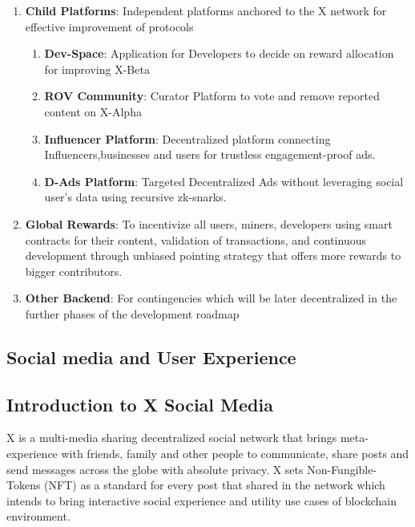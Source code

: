 \documentclass[letterpaper,11pt]{article}
\begin{document}
\begin{enumerate}[wide, labelwidth=!, labelindent=0pt]
\begin{enumerate}[wide, labelwidth=!, labelindent=0pt]
\end{enumerate}

\item \textbf{Child Platforms}: Independent platforms anchored to the X network for effective improvement of protocols

\begin{enumerate}[wide, labelwidth=!, labelindent=0pt]

\item \textbf{Dev-Space}: Application for Developers to decide on reward allocation for improving X-Beta

\item \textbf{ROV Community}: Curator Platform to vote and remove reported content on X-Alpha
\item \textbf{Influencer Platform}: Decentralized platform connecting Influencers,businesses and users for trustless engagement-proof ads.

\item \textbf{D-Ads Platform}: Targeted Decentralized Ads without leveraging social user's data using recursive zk-snarks.

\end{enumerate}

\item \textbf{Global Rewards}: To incentivize all users, miners, developers using smart contracts for their content, validation of transactions, and continuous development through unbiased pointing strategy that offers more rewards to bigger contributors.


\item \textbf{Other Backend}: For contingencies which will be later decentralized in the further phases of the development roadmap

\end{enumerate}

\subsection{\textbf{Social media and User Experience}}




\subsection{\textbf{Introduction to X Social Media}}

X is a multi-media sharing decentralized social network that brings meta-experience with friends, family and other people to communicate, share posts and send messages across the globe with absolute privacy. X sets Non-Fungible-Tokens (NFT) as a standard for every post that shared in the network which intends to bring interactive social experience and utility use cases of blockchain environment.\\
\end{document}
